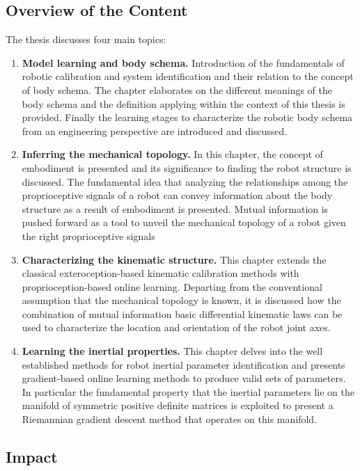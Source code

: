 \documentclass[12pt, a4paper]{article}
\begin{document}
\subsection*{Overview of the Content}
The thesis discusses four main topics:
\begin{enumerate}
	\item \textbf{Model learning and body schema.} Introduction of the fundamentals of robotic calibration and system identification and their relation to the concept of body schema. The chapter elaborates on the different meanings of the body schema and the definition applying within the context of this thesis is provided. Finally the learning stages to characterize the robotic body schema from an engineering perspective are introduced and discussed.
	
	\item \textbf{Inferring the mechanical topology.} In this chapter, the concept of embodiment is presented and its significance to finding the robot structure is discussed. The fundamental idea that analyzing the relationships among the proprioceptive signals of a robot can convey information about the body structure as a result of embodiment is presented. Mutual information is pushed forward as a tool to unveil the mechanical topology of a robot given the right proprioceptive signals
	
	\item \textbf{Characterizing the kinematic structure.} This chapter extends the classical exteroception-based kinematic calibration methods with proprioception-based online learning. Departing from the conventional assumption that the mechanical topology is known, it is discussed how the combination of mutual information basic differential kinematic laws can be used to characterize the location and orientation of the robot joint axes.
	
	\item \textbf{Learning the inertial properties.} This chapter delves into the well established methods for robot inertial parameter identification and presents gradient-based online learning methods to produce valid sets of parameters. In particular the fundamental property that the inertial parameters lie on the manifold of symmetric positive definite matrices is exploited to present a Riemannian gradient descent method that operates on this manifold. 
\end{enumerate}

\subsection*{Impact}
\end{document}
